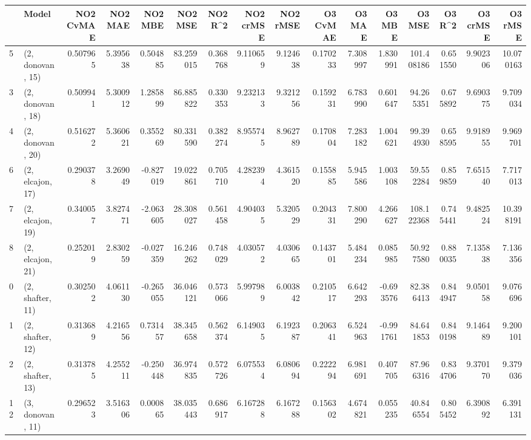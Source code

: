 \begin{tabular}{llrrrrrrrrrrrrrr}
\toprule
{} &             Model &  NO2 CvMAE &   NO2 MAE &   NO2 MBE &    NO2 MSE &   NO2 R\textasciicircum2 &  NO2 crMSE &  NO2 rMSE &  O3 CvMAE &    O3 MAE &    O3 MBE &      O3 MSE &    O3 R\textasciicircum2 &   O3 crMSE &    O3 rMSE \\
\midrule
5  &  (2, donovan, 15) &   0.507965 &  5.395638 &  0.504885 &  83.259015 &  0.368768 &   9.110659 &  9.124638 &  0.170233 &  7.308997 &  1.830991 &  101.408186 &  0.651550 &   9.902306 &  10.070163 \\
3  &  (2, donovan, 18) &   0.509941 &  5.300912 &  1.285899 &  86.885822 &  0.330353 &   9.232133 &  9.321256 &  0.159231 &  6.783990 &  0.601647 &   94.265351 &  0.675892 &   9.690375 &   9.709034 \\
4  &  (2, donovan, 20) &   0.516272 &  5.360621 &  0.355269 &  80.331590 &  0.382274 &   8.955745 &  8.962789 &  0.170804 &  7.283182 &  1.004621 &   99.394930 &  0.658595 &   9.918955 &   9.969701 \\
6  &  (2, elcajon, 17) &   0.290378 &  3.269049 & -0.827019 &  19.022861 &  0.705710 &   4.282394 &  4.361520 &  0.155885 &  5.945586 &  1.003108 &   59.552284 &  0.859859 &   7.651540 &   7.717013 \\
7  &  (2, elcajon, 19) &   0.340057 &  3.827471 & -2.063605 &  28.308027 &  0.561458 &   4.904035 &  5.320529 &  0.204331 &  7.800290 &  4.266627 &  108.122368 &  0.745441 &   9.482524 &  10.398191 \\
8  &  (2, elcajon, 21) &   0.252019 &  2.830259 & -0.027359 &  16.246262 &  0.748029 &   4.030572 &  4.030665 &  0.143701 &  5.484234 &  0.085985 &   50.927580 &  0.880035 &   7.135838 &   7.136356 \\
0  &  (2, shafter, 11) &   0.302502 &  4.061130 & -0.265055 &  36.046121 &  0.573066 &   5.997989 &  6.003842 &  0.210517 &  6.642293 & -0.693576 &   82.386413 &  0.844947 &   9.050158 &   9.076696 \\
1  &  (2, shafter, 12) &   0.313689 &  4.216556 &  0.731457 &  38.345658 &  0.562374 &   6.149035 &  6.192387 &  0.206341 &  6.524963 & -0.991761 &   84.641853 &  0.840198 &   9.146489 &   9.200101 \\
2  &  (2, shafter, 13) &   0.313785 &  4.255211 & -0.250448 &  36.974835 &  0.572726 &   6.075534 &  6.080694 &  0.222294 &  6.981691 &  0.407705 &   87.966316 &  0.834706 &   9.370170 &   9.379036 \\
12 &  (3, donovan, 11) &   0.296523 &  3.516306 &  0.000865 &  38.035443 &  0.686917 &   6.167288 &  6.167288 &  0.156302 &  4.674821 &  0.055235 &   40.846554 &  0.805452 &   6.390892 &   6.391131 \\

\end{tabular}
